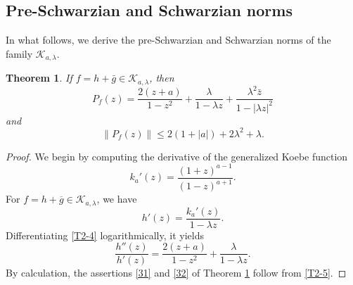 \documentclass[11pt, reqno]{amsart}
\newtheorem{theorem}{Theorem}
\numberwithin{equation}{section}
\newcommand{\abs}[1]{\left\vert#1\right\vert}
\newcommand{\D}{\mbox{$\mathbb{D}$}}
\begin{document}
\subsection{Pre-Schwarzian and Schwarzian norms}
In what follows, we derive the pre-Schwarzian and Schwarzian norms of the family $\mathcal{K}_{a,\lambda}$.
\begin{theorem}\label{T2}
	If $f=h+\bar{g}\in\mathcal{K}_{a,\lambda}$, then %
    \begin{equation}\label{31}
        P_f(z)=\dfrac{2(z+a)}{1-z^2}+\dfrac{\lambda}{1-\lambda z}+\dfrac{\lambda^2\bar{z}}{1-\abs{\lambda z}^2}
    \end{equation}
    and
     \begin{equation}\label{32}
       \|P_f(z)\|\leq2\left(1+\abs{a}\right)+2\lambda^2+\lambda.
    \end{equation}
   
\end{theorem}
\begin{proof}
	We begin by computing the derivative of the generalized Koebe function
\begin{equation}\label{T2-3} 	  k_a'(z)=\dfrac{{(1+z)}^{a-1}}{{(1-z)}^{a+1}}.
	\end{equation}
    For $f=h+\overline{g}\in\mathcal{K}_{a,\lambda}$, we have 
	 \begin{equation}\label{T2-4}
	    h'(z)=\dfrac{k_a'(z)}{1-\lambda z}.
	\end{equation}
    Differentiating \eqref{T2-4} logarithmically, it yields
    \begin{equation}\label{T2-5}
        \dfrac{h''(z)}{h'(z)}=\dfrac{2(z+a)}{1-z^2}+\dfrac{\lambda}{1-\lambda z}.
    \end{equation}
     By calculation, the assertions \eqref{31} and \eqref{32} of Theorem \ref{T2} follow from \eqref{T2-5}.
\end{proof}
\end{document}
